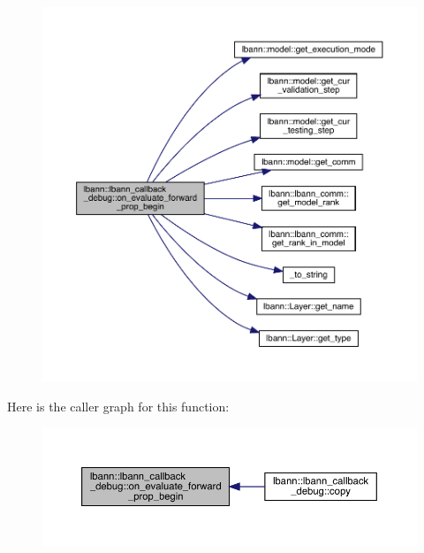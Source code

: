 \begin{figure}[H]
\begin{center}
\leavevmode
\includegraphics[width=350pt]{classlbann_1_1lbann__callback__debug_a83fe16882119a54afe59ba616fe1722a_cgraph}
\end{center}
\end{figure}
Here is the caller graph for this function\+:\nopagebreak
\begin{figure}[H]
\begin{center}
\leavevmode
\includegraphics[width=350pt]{classlbann_1_1lbann__callback__debug_a83fe16882119a54afe59ba616fe1722a_icgraph}
\end{center}
\end{figure}
\mbox{\label{classlbann_1_1lbann__callback__debug_a19639823e288e7599947c0abfaa6d1f4}} 
